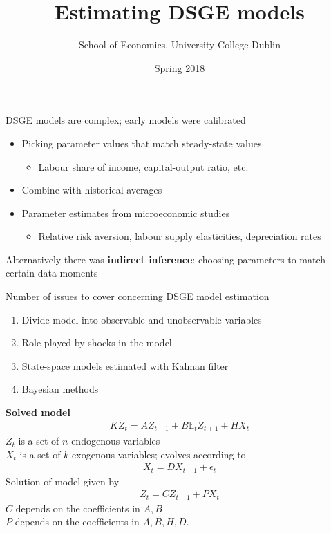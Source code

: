 \documentclass{beamer}
\title{Estimating DSGE models}
\author{School of Economics, University College Dublin}
\date{Spring 2018}
\begin{document}
\begin{frame}
 \titlepage
\end{frame}

\begin{frame}
 DSGE models are complex; early models were calibrated
 \begin{itemize}
     \item Picking parameter values that match steady-state values
     \begin{itemize}
       \item Labour share of income, capital-output ratio, etc. 
     \end{itemize}
     \item Combine with historical averages
     \item Parameter estimates from microeconomic studies 
     \begin{itemize}
       \item Relative risk aversion, labour supply elasticities, depreciation rates
     \end{itemize}
   \end{itemize}  
   \medskip
   Alternatively there was \textbf{indirect inference}: choosing parameters to match certain data moments
\end{frame}

\begin{frame}
  Number of issues to cover concerning DSGE model estimation\medskip  
\begin{enumerate}
  \item Divide model into observable and unobservable variables
  \item Role played by shocks in the model
  \item State-space models estimated with Kalman filter
  \item Bayesian methods
\end{enumerate}
\end{frame}

\begin{frame}
  \textbf{Solved model}  
\begin{align}  
  KZ_t = AZ_{t-1} + B\mathbb{E}_tZ_{t+1} + HX_t 
\end{align}
$Z_t$ is a set of $n$ endogenous variables\\
$X_t$ is a set of $k$ exogenous variables; evolves according to 
\begin{align}
  X_t=DX_{t-1}+\epsilon_t
\end{align}
\medskip
Solution of model given by
\begin{align}  
  Z_t=CZ_{t-1}+PX_t 
\end{align}
$C$ depends on the coefficients in $A,B$\\
$P$ depends on the coefficients in $A,B,H,D$.
\end{frame}
\end{document}
